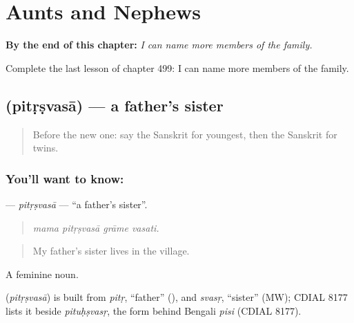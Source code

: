 
\chapter{Aunts and Nephews}
\label{ch:sa-aunts-and-nephews}

\begin{chapteropening}
\textbf{By the end of this chapter:} \emph{I can name more members of the family.}

Complete the last lesson of chapter 499: I can name more members of the family.
\end{chapteropening}

\section[\texorpdfstring{\sk{पितृष्वसा} (pitṛṣvasā)}{पितृष्वसा (pitṛṣvasā)}]{ (pitṛṣvasā) — a father's sister}

\label{lesson:SA-C499-pitrsvasa}



\begin{quote}
Before the new one: say the Sanskrit for youngest, then the Sanskrit for twins.
\end{quote}

\subsection*{You'll want to know: }
\textbf{} — \emph{pitṛṣvasā} — \textquotedblleft{}a father's sister\textquotedblright{}.

\begin{quote}
   
\end{quote}

\begin{quote}
\emph{mama pitṛṣvasā grāme vasati.}
\end{quote}

\begin{quote}
My father's sister lives in the village.
\end{quote}

A feminine noun.

\begin{cousinweb}
\textbf{} (\emph{pitṛṣvasā}) is built from \emph{pitṛ}, \textquotedblleft{}father\textquotedblright{} (\textbf{}), and \emph{svasṛ}, \textquotedblleft{}sister\textquotedblright{} (MW); CDIAL 8177 lists it beside \emph{pituḥṣvasṛ}, the form behind Bengali \emph{pisi} (CDIAL 8177).
\end{cousinweb}

